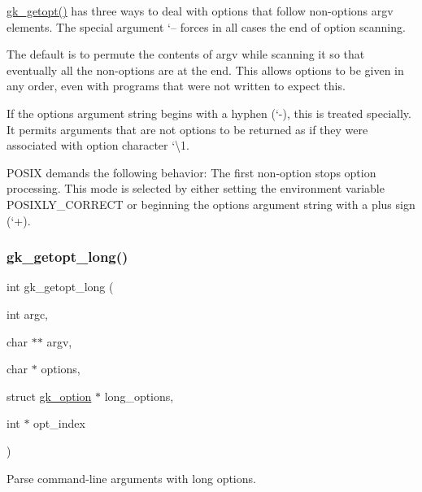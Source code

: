 \hyperlink{a00038_af82cf3b0fb9ec4411a987f02df3b2e47}{gk\+\_\+getopt()} has three ways to deal with options that follow non-\/options {\ttfamily argv} elements. The special argument {\ttfamily `--\textquotesingle{}} forces in all cases the end of option scanning.
\begin{DoxyItemize}
\item The default is to permute the contents of {\ttfamily argv} while scanning it so that eventually all the non-\/options are at the end. This allows options to be given in any order, even with programs that were not written to expect this.
\item If the options argument string begins with a hyphen (`-\/\textquotesingle{}), this is treated specially. It permits arguments that are not options to be returned as if they were associated with option character `\textbackslash{}1\textquotesingle{}.
\item P\+O\+S\+IX demands the following behavior\+: The first non-\/option stops option processing. This mode is selected by either setting the environment variable P\+O\+S\+I\+X\+L\+Y\+\_\+\+C\+O\+R\+R\+E\+CT or beginning the options argument string with a plus sign (`+\textquotesingle{}). 
\end{DoxyItemize}\mbox{\label{a00050_acc525a155d3432e9a66f946d41528c8f}} 
\subsubsection{\texorpdfstring{gk\+\_\+getopt\+\_\+long()}{gk\_getopt\_long()}}
{\footnotesize\ttfamily int gk\+\_\+getopt\+\_\+long (\begin{DoxyParamCaption}\item[{int}]{argc,  }\item[{char $\ast$$\ast$}]{argv,  }\item[{char $\ast$}]{options,  }\item[{struct \hyperlink{a00630}{gk\+\_\+option} $\ast$}]{long\+\_\+options,  }\item[{int $\ast$}]{opt\+\_\+index }\end{DoxyParamCaption})}



Parse command-\/line arguments with long options. 


